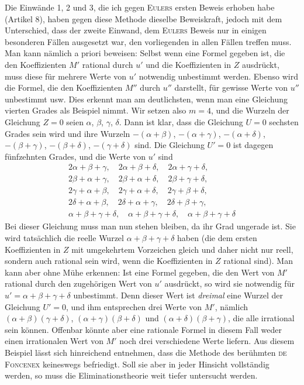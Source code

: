Die Einwände 1, 2 und 3, die ich gegen \textsc{Eulers} ersten Beweis erhoben habe (Artikel 8), haben gegen diese Methode dieselbe Beweiskraft, jedoch mit dem Unterschied, dass der zweite Einwand, dem \textsc{Eulers} Beweis nur in einigen besonderen Fällen ausgesetzt war, den vorliegenden in allen Fällen treffen muss. Man kann nämlich a priori beweisen: Selbst wenn eine Formel gegeben ist, die den Koeffizienten $M'$ rational durch $u'$ und die Koeffizienten in $Z$ ausdrückt, muss diese für mehrere Werte von $u'$ notwendig unbestimmt werden. Ebenso wird die Formel, die den Koeffizienten $M''$ durch $u''$ darstellt, für gewisse Werte von $u''$ unbestimmt usw. Dies erkennt man am deutlichsten, wenn man eine Gleichung vierten Grades als Beispiel nimmt. Wir setzen also $m=4$, und die Wurzeln der Gleichung $Z=0$ seien $\alpha$, $\beta$, $\gamma$, $\delta$. Dann ist klar, dass die Gleichung $U=0$ sechsten Grades sein wird und ihre Wurzeln $-(\alpha+\beta)$, $-(\alpha+\gamma)$, $-(\alpha+\delta)$, $-(\beta+\gamma)$, $-(\beta+\delta)$, $-(\gamma+\delta)$ sind. Die Gleichung $U'=0$ ist dagegen fünfzehnten Grades, und die Werte von $u'$ sind
\[
\begin{gathered}
2\alpha+\beta+\gamma,\quad 2\alpha+\beta+\delta,\quad 2\alpha+\gamma+\delta,\\
2\beta+\alpha+\gamma,\quad 2\beta+\alpha+\delta,\quad 2\beta+\gamma+\delta,\\
2\gamma+\alpha+\beta,\quad 2\gamma+\alpha+\delta,\quad 2\gamma+\beta+\delta,\\
2\delta+\alpha+\beta,\quad 2\delta+\alpha+\gamma,\quad 2\delta+\beta+\gamma,\\
\alpha+\beta+\gamma+\delta,\quad\alpha+\beta+\gamma+\delta,\quad\alpha+\beta+\gamma+\delta
\end{gathered}
\]
Bei dieser Gleichung muss man nun stehen bleiben, da ihr Grad ungerade ist. Sie wird tatsächlich die reelle Wurzel $\alpha+\beta+\gamma+\delta$ haben (die dem ersten Koeffizienten in $Z$ mit umgekehrtem Vorzeichen gleich und daher nicht nur reell, sondern auch rational sein wird, wenn die Koeffizienten in $Z$ rational sind). Man kann aber ohne Mühe erkennen: Ist eine Formel gegeben, die den Wert von $M'$ rational durch den zugehörigen Wert von $u'$ ausdrückt, so wird sie notwendig für $u'=\alpha+\beta+\gamma+\delta$ unbestimmt. Denn dieser Wert ist \textit{dreimal} eine Wurzel der Gleichung $U'=0$, und ihm entsprechen drei Werte von $M'$, nämlich $(\alpha+\beta)(\gamma+\delta)$, $(\alpha+\gamma)(\beta+\delta)$ und $(\alpha+\delta)(\beta+\gamma)$, die alle irrational sein können. Offenbar könnte aber eine rationale Formel in diesem Fall weder einen irrationalen Wert von $M'$ noch drei verschiedene Werte liefern. Aus diesem Beispiel lässt sich hinreichend entnehmen, dass die Methode des berühmten \textsc{de Foncenex} keineswegs befriedigt. Soll sie aber in jeder Hinsicht vollständig werden, so muss die Eliminationstheorie weit tiefer untersucht werden.

